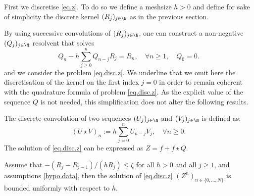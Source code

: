 \documentclass[]{jnsao}
\renewcommand{\tr}{R}
\begin{document}
First we discretise \eqref{eq.z}. To do so we define a meshsize $h>0$ and define for sake of
simplicity the discrete kernel $(R_j)_{j\in\N}$ as in the previous section.


 By using successive convolutions of $(\tr_j)_{j\in\N}$, one can construct a non-negative $(Q_j)_{j\in\N}$ resolvent that solves 
 $$
 Q_n - h \sum_{j\geq 0}^n Q_{n-j} \tr_j = \tr_n, \quad \forall n \geq 1,\quad Q_0 = 0.
 $$
and we consider the problem \eqref{eq.disc.z}. We underline that we omit here 
the discretisation of the kernel on the first index $j=0$ in order to remain coherent 
with the quadrature formula of problem \eqref{eq.disc.z}. As the explicit value of the sequence $Q$
is not needed, this simplification does not alter the following results.

 The discrete convolution of two sequences $(U_j)_{j\in\N}$ and $(V_j)_{j\in\N}$ is defined as:
 $$
 (U \star V)_n := h \sum_{j=0}^n U_{n-j} V_j , \quad \forall n \geq 0.
 $$
 The solution of \eqref{eq.disc.z} can be expressed as $Z = f + f \star Q$.

\begin{theorem}\label{thm.comp.disc}
	Assume that $-(R_j-R_{j-1})/(hR_j) \leq \zeta$ for all $h>0$ and all $j\geq 1$, 
	and assumptions \ref{hypo.data}, then the solution of \eqref{eq.disc.z} 
	$(Z^n)_{n\in \{0,\dots,N\}}$ is bounded uniformly with respect to $h$.
\end{theorem}
\end{document}
